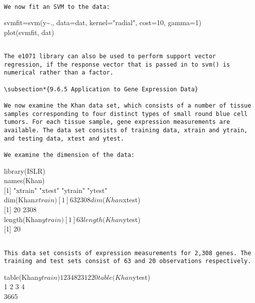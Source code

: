 \documentclass[10pt]{article}
\begin{document}
\begin{verbatim}

We now fit an SVM to the data:
\end{verbatim}

\begin{displayquote}
svmfit=svm(y\~{}., data=dat, kernel="radial", cost=10, gamma=1)\\
plot(svmfit, dat)
\end{displayquote}

\begin{verbatim}

The e1071 library can also be used to perform support vector regression, if the response vector that is passed in to svm() is numerical rather than a factor.

\subsection*{9.6.5 Application to Gene Expression Data}

We now examine the Khan data set, which consists of a number of tissue samples corresponding to four distinct types of small round blue cell tumors. For each tissue sample, gene expression measurements are available. The data set consists of training data, xtrain and ytrain, and testing data, xtest and ytest.

We examine the dimension of the data:
\end{verbatim}

\begin{displayquote}
library(ISLR)\\
names(Khan)\\[0pt]
[1] "xtrain" "xtest" "ytrain" "ytest"\\
dim(Khan$xtrain)
[1] 63 2308
dim(Khan$xtest)\\[0pt]
[1] 20 2308\\
length(Khan$ytrain)
[1] 63
length(Khan$ytest)\\[0pt]
[1] 20
\end{displayquote}

\begin{verbatim}

This data set consists of expression measurements for 2,308 genes. The training and test sets consist of 63 and 20 observations respectively.
\end{verbatim}

\begin{displayquote}
table(Khan$ytrain)
    1 2 3 4
8 23 12 20
table(Khan$ytest)\\
1 2 3 4\\
3665
\end{displayquote}
\end{document}
